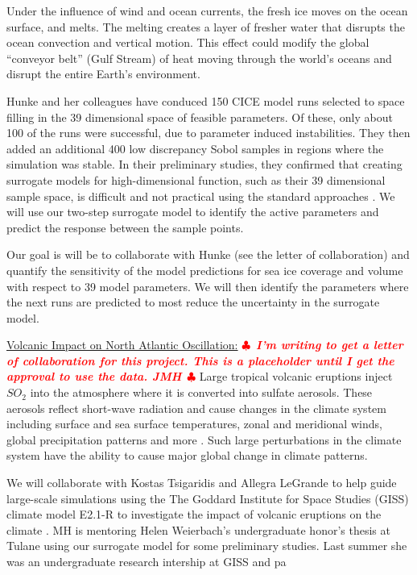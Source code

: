 \documentclass[11pt]{NSFamsart}
\newif\ifnotesw \noteswtrue
\newcommand{\notes}[1]{\ifnotesw \textcolor{red}{  $\clubsuit$\ {\sf \bf \it  #1}\ $\clubsuit$  }\fi}
\begin{document}
Under the influence of wind and ocean currents, the  fresh ice moves on the ocean surface, and melts.  The melting creates a layer of fresher water that disrupts the ocean convection and vertical motion.  This effect could modify the global “conveyor belt” (Gulf Stream) of heat moving through the world’s oceans and disrupt the entire Earth's environment. 
   
Hunke and her colleagues have conduced 150 CICE model runs selected to space filling in the 39 dimensional  space of feasible  parameters.   Of these, only about 100 of the runs were successful, due to parameter induced instabilities.  They then added an additional 400 low discrepancy Sobol samples in regions where the simulation was stable.  In their preliminary studies, they confirmed that creating surrogate models for high-dimensional function, such as their 39 dimensional sample space, is difficult and not practical using the standard approaches \cite{bengio2006curse, o2010oxford}.  We will use our two-step surrogate model to identify the active parameters and predict the response between the sample points.  

Our goal is will be to collaborate with Hunke (see the letter of collaboration) and quantify the sensitivity of the model predictions for sea ice coverage and volume with respect to 39 model parameters.  We will then identify the parameters where the next runs are predicted to most reduce the uncertainty in the surrogate model.
    
  
\underline{Volcanic Impact on North Atlantic Oscillation:}\notes{I'm writing to get a letter of collaboration for this project. This is a placeholder until I get the approval to use the data. JMH}
Large tropical volcanic eruptions inject ${SO_2}$ into the atmosphere where it is converted into sulfate aerosols.  These aerosols reflect short-wave radiation and cause changes in the climate system including surface and sea surface temperatures, zonal and meridional winds, global precipitation patterns and more \cite{zanchettin2013background, legrande2015volcanic}.  Such large perturbations in the climate system have the ability to cause major global change in climate patterns.

We will collaborate with Kostas Tsigaridis and Allegra LeGrande to help guide large-scale simulations using the The Goddard Institute for Space Studies (GISS) climate model E2.1-R to investigate the impact of volcanic eruptions on the climate
\cite{zanchettin2016model}.  MH is mentoring Helen Weierbach's undergraduate honor's thesis at Tulane using our surrogate model for some preliminary studies.  Last summer she was an undergraduate research intership at GISS and pa
\end{document}
